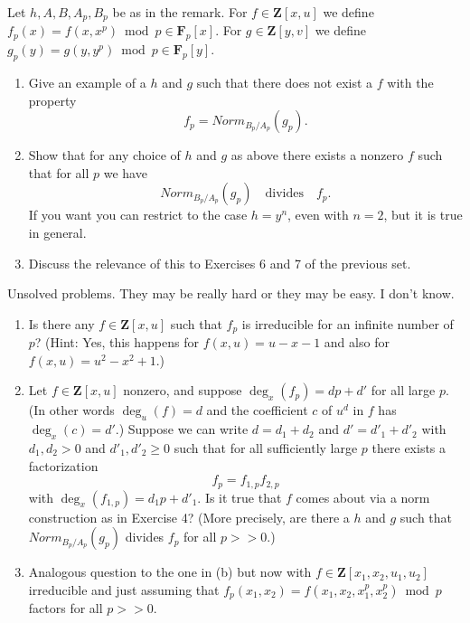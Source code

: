 \begin{exercise}
\label{exercise-strange-fp-3}
Let $h, A, B, A_p, B_p$ be as in the remark. For $f \in {\mathbf Z}[x, u]$ we
define $f_p(x) = f(x, x^p) \bmod p \in {\mathbf F}_p[x]$. For
$g \in {\mathbf Z}[y, v]$ we define
$g_p(y) = g(y, y^p) \bmod p \in {\mathbf F}_p[y]$.
\begin{enumerate}
\item Give an example of a $h$ and $g$ such that
there does not exist a $f$ with the property
$$
f_p  =  Norm_{B_p/A_p}(g_p).
$$
\item Show that for any choice of $h$ and $g$ as above
there exists a nonzero $f$ such that for all $p$ we have
$$
Norm_{B_p/A_p}(g_p)\quad\text{divides}\quad f_p .
$$
If you want you can restrict to the case $h = y^n$, even with $n = 2$,
but it is true in general.
\item Discuss the relevance of this to Exercises 6 and 7 of the previous
set.
\end{enumerate}
\end{exercise}

\begin{exercise}
\label{exercise-strange-fp-unsolved}
Unsolved problems. They may be really hard or they may be easy.
I don't know.
\begin{enumerate}
\item Is there any $f \in {\mathbf Z}[x, u]$ such that $f_p$ is
irreducible for an infinite number of $p$? (Hint: Yes, this happens for
$f(x, u) = u - x - 1$ and also for $f(x, u) = u^2 - x^2 + 1$.)
\item Let $f \in {\mathbf Z}[x, u]$ nonzero, and suppose
$\deg_x(f_p) = dp + d'$ for all large $p$. (In other words $\deg_u(f) = d$
and the coefficient $c$ of $u^d$ in $f$ has $\deg_x(c) = d'$.) Suppose we
can write $d = d_1 + d_2$ and $d' = d'_1 + d'_2$ with $d_1, d_2 > 0$
and $d'_1, d'_2 \geq 0$ such that for all sufficiently large $p$
there exists a factorization
$$
f_p = f_{1, p} f_{2, p}
$$
with $\deg_x(f_{1, p}) = d_1p + d'_1$. Is it true that $f$ comes about via a
norm construction as in Exercise 4? (More precisely, are there a $h$ and
$g$ such that $Norm_{B_p/A_p}(g_p)$ divides $f_p$ for all $p >> 0$.)
\item Analogous question to the one in (b) but now with
$f \in {\mathbf Z}[x_1, x_2, u_1, u_2]$ irreducible and just assuming that
$f_p(x_1, x_2) = f(x_1, x_2, x_1^p, x_2^p) \bmod p$ factors for all
$p >> 0$.
\end{enumerate}
\end{exercise}


















